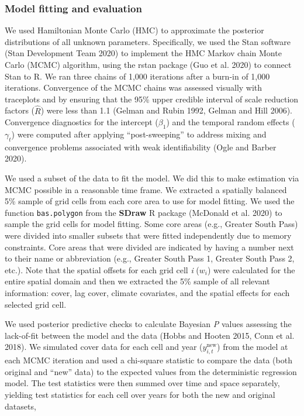 \documentclass[
  12pt,
]{article}
\begin{document}
\hypertarget{model-fitting-and-evaluation}{%
\subsubsection{Model fitting and evaluation}\label{model-fitting-and-evaluation}}

We used Hamiltonian Monte Carlo (HMC) to approximate the posterior distributions of all unknown parameters.
Specifically, we used the Stan software (Stan Development Team 2020) to implement the HMC Markov chain Monte Carlo (MCMC) algorithm, using the rstan package (Guo et al. 2020) to connect Stan to R.
We ran three chains of 1,000 iterations after a burn-in of 1,000 iterations.
Convergence of the MCMC chains was assessed visually with traceplots and by ensuring that the 95\% upper credible interval of scale reduction factors (\(\hat{R}\)) were less than 1.1 (Gelman and Rubin 1992, Gelman and Hill 2006).
Convergence diagnostics for the intercept (\(\beta_1\)) and the temporal random effects (\(\gamma_t\)) were computed after applying ``post-sweeping'' to address mixing and convergence problems associated with weak identifiability (Ogle and Barber 2020).

We used a subset of the data to fit the model.
We did this to make estimation via MCMC possible in a reasonable time frame.
We extracted a spatially balanced 5\% sample of grid cells from each core area to use for model fitting.
We used the function \texttt{bas.polygon} from the \textbf{SDraw} R package (McDonald et al. 2020) to sample the grid cells for model fitting.
Some core areas (e.g., Greater South Pass) were divided into smaller subsets that were fitted independently due to memory constraints.
Core areas that were divided are indicated by having a number next to their name or abbreviation (e.g., Greater South Pass 1, Greater South Pass 2, etc.).
Note that the spatial offsets for each grid cell \emph{i} (\(w_i\)) were calculated for the entire spatial domain and then we extracted the 5\% sample of all relevant information: cover, lag cover, climate covariates, and the spatial effects for each selected grid cell.

We used posterior predictive checks to calculate Bayesian \emph{P} values assessing the lack-of-fit between the model and the data (Hobbs and Hooten 2015, Conn et al. 2018).
We simulated cover data for each cell and year (\(y^{\text{new}}_{i,t}\)) from the model at each MCMC iteration and used a chi-square statistic to compare the data (both original and ``new'' data) to the expected values from the deterministic regression model.
The test statistics were then summed over time and space separately, yielding test statistics for each cell over years for both the new and original datasets,
\end{document}
